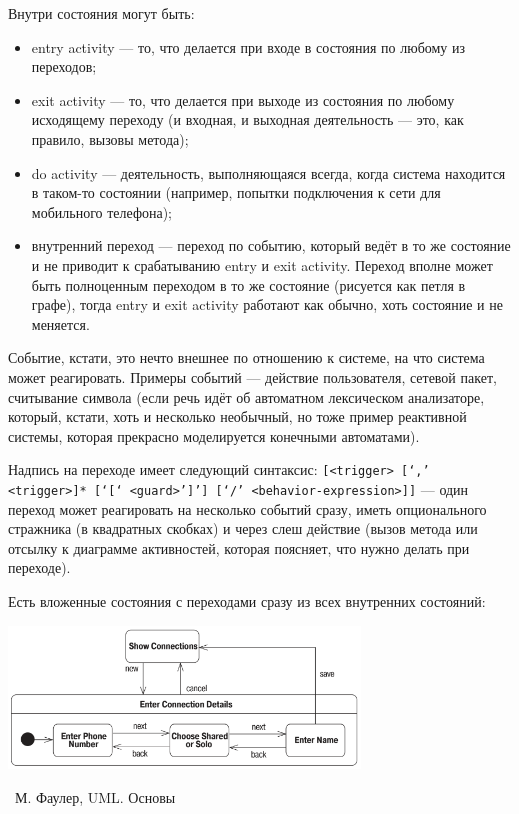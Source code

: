 \documentclass[a5paper]{article}
\newcommand{\attribution}[1] {
	\vspace{-5mm}\begin{flushright}\begin{scriptsize}%
	{\textcopyright\, #1}\end{scriptsize}\end{flushright}
}
\begin{document}
Внутри состояния могут быть:

\begin{itemize}
	\item entry activity --- то, что делается при входе в состояния по любому из переходов;
	\item exit activity --- то, что делается при выходе из состояния по любому исходящему переходу (и входная, и выходная деятельность --- это, как правило, вызовы метода);
	\item do activity --- деятельность, выполняющаяся всегда, когда система находится в таком-то состоянии (например, попытки подключения к сети для мобильного телефона);
	\item внутренний переход --- переход по событию, который ведёт в то же состояние и не приводит к срабатыванию entry и exit activity. Переход вполне может быть полноценным переходом в то же состояние (рисуется как петля в графе), тогда entry и exit activity работают как обычно, хоть состояние и не меняется.
\end{itemize}

Событие, кстати, это нечто внешнее по отношению к системе, на что система может реагировать. Примеры событий --- действие пользователя, сетевой пакет, считывание символа (если речь идёт об автоматном лексическом анализаторе, который, кстати, хоть и несколько необычный, но тоже пример реактивной системы, которая прекрасно моделируется конечными автоматами).

Надпись на переходе имеет следующий синтаксис: \verb|[<trigger> [‘,’ <trigger>]* [‘[‘ <guard>’]’] [‘/’ <behavior-expression>]]| --- один переход может реагировать на несколько событий сразу, иметь опционального стражника (в квадратных скобках) и через слеш действие (вызов метода или отсылку к диаграмме активностей, которая поясняет, что нужно делать при переходе).

Есть вложенные состояния с переходами сразу из всех внутренних состояний:

\begin{center}
	\includegraphics[width=0.7\textwidth]{stateTransitionNestedStates.png}
	\attribution{М. Фаулер, UML. Основы}
\end{center}
\end{document}
